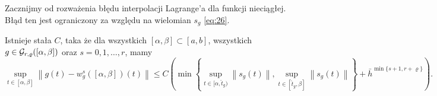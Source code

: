 \documentclass[oik, pdftex, man]{mgrwms}
\begin{document}
    Zacznijmy od rozważenia błędu interpolacji Lagrange'a dla funkcji nieciągłej. Błąd ten jest ograniczony za względu na wielomian $s_{g}$ \eqref{eq:26}.

    \begin{lemma} \label{lem:1:2014}
        Istnieje stała $C$, taka że dla wszystkich $[\alpha, \beta] \subset [a, b]$, wszystkich $g \in \mathcal{G}_{r,\varrho}([\alpha,\beta])$ oraz $s=0,1,\dots,r$, mamy
        \begin{equation*}
            \sup _{t \in[\alpha, \beta]}\left\|g(t)-w_{g}^{s}([\alpha, \beta])(t)\right\| \leq 
                C\left(\min \left\{\sup_{t \in[\alpha, \hat{t}_{g})}\left\|s_{g}(t)\right\|, \sup _{t \in [\hat{t}_{g}, \beta]}\left\|s_{g}(t)\right\|\right\}+\bar{h}^{\min \{s+1, r+\varrho\}}\right).
        \end{equation*}
    \end{lemma}
\end{document}
